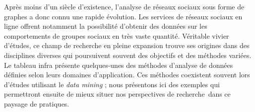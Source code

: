 Après moins d{\textquoteright}un siècle d{\textquoteright}existence, l{\textquoteright}analyse de réseaux sociaux sous forme de graphes a donc connu une rapide évolution. Les services de réseaux sociaux en ligne offrent notamment la possibilité d{\textquoteright}obtenir des données sur les comportements de groupes sociaux en très vaste quantité. Véritable vivier d{\textquoteright}études, ce champ de recherche en pleine expansion trouve ses origines dans des disciplines diverses qui poursuivent souvent des objectifs et des méthodes variées. Le tableau infra présente quelques-unes des méthodes d{\textquoteright}analyse de données définies selon leurs domaines d{\textquoteright}application. Ces méthodes coexistent souvent lors d{\textquoteright}études utilisant le \textit{data mining} ; nous présentons ici des exemples qui permettront ensuite de mieux situer nos perspectives de recherche~dans ce paysage de pratiques.

